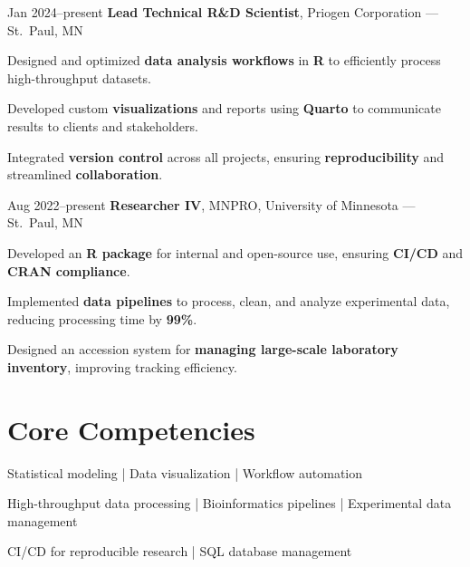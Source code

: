 \documentclass{resume}
\begin{document}
        \begin{twocolentry}{Jan 2024--present}
            \textbf{Lead Technical R\&D Scientist}, Priogen Corporation --- St.\ Paul, MN
        \end{twocolentry}
        \begin{onecolentry}
            \begin{highlights}
                \item Designed and optimized \textbf{data analysis workflows} in \textbf{R} to efficiently process high-throughput datasets.
                \item Developed custom \textbf{visualizations} and reports using \textbf{Quarto} to communicate results to clients and stakeholders.
                \item Integrated \textbf{version control} across all projects, ensuring \textbf{reproducibility} and streamlined \textbf{collaboration}.
            \end{highlights}
        \end{onecolentry}

        \begin{twocolentry}{Aug 2022--present}
            \textbf{Researcher IV}, MNPRO, University of Minnesota --- St.\ Paul, MN
        \end{twocolentry}
        \begin{onecolentry}
            \begin{highlights}
                \item Developed an \textbf{R package} for internal and open-source use, ensuring \textbf{CI/CD} and \textbf{CRAN compliance}.
                \item Implemented \textbf{data pipelines} to process, clean, and analyze experimental data, reducing processing time by \textbf{99\%}.
                \item Designed an accession system for \textbf{managing large-scale laboratory inventory}, improving tracking efficiency.
            \end{highlights}
        \end{onecolentry}

    
    \section{Core Competencies}
    
        \begin{onecolentry}
            \begin{highlights}
                \item Statistical modeling | Data visualization | Workflow automation  
                \item High-throughput data processing | Bioinformatics pipelines | Experimental data management  
                \item CI/CD for reproducible research | SQL database management 
            \end{highlights}
        \end{onecolentry}
    
\end{document}

